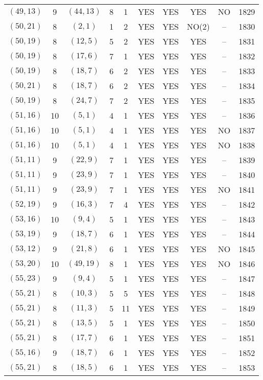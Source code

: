\begin{longtable}{|c|c|c|c|c|c|c|c|c|c|}
$(49, 13)$ & 9 & $(44, 13)$ & 8 & 1 & YES & YES & YES & NO & 1829\\
$(50, 21)$ & 8 & $(2, 1)$ & 1 & 2 & YES & YES & NO(2) & -- & 1830\\
$(50, 19)$ & 8 & $(12, 5)$ & 5 & 2 & YES & YES & YES & -- & 1831\\
$(50, 19)$ & 8 & $(17, 6)$ & 7 & 1 & YES & YES & YES & -- & 1832\\
$(50, 19)$ & 8 & $(18, 7)$ & 6 & 2 & YES & YES & YES & -- & 1833\\
$(50, 21)$ & 8 & $(18, 7)$ & 6 & 2 & YES & YES & YES & -- & 1834\\
$(50, 19)$ & 8 & $(24, 7)$ & 7 & 2 & YES & YES & YES & -- & 1835\\
$(51, 16)$ & 10 & $(5, 1)$ & 4 & 1 & YES & YES & YES & -- & 1836\\
$(51, 16)$ & 10 & $(5, 1)$ & 4 & 1 & YES & YES & YES & NO & 1837\\
$(51, 16)$ & 10 & $(5, 1)$ & 4 & 1 & YES & YES & YES & NO & 1838\\
$(51, 11)$ & 9 & $(22, 9)$ & 7 & 1 & YES & YES & YES & -- & 1839\\
$(51, 11)$ & 9 & $(23, 9)$ & 7 & 1 & YES & YES & YES & -- & 1840\\
$(51, 11)$ & 9 & $(23, 9)$ & 7 & 1 & YES & YES & YES & NO & 1841\\
$(52, 19)$ & 9 & $(16, 3)$ & 7 & 4 & YES & YES & YES & -- & 1842\\
$(53, 16)$ & 10 & $(9, 4)$ & 5 & 1 & YES & YES & YES & -- & 1843\\
$(53, 19)$ & 9 & $(18, 7)$ & 6 & 1 & YES & YES & YES & -- & 1844\\
$(53, 12)$ & 9 & $(21, 8)$ & 6 & 1 & YES & YES & YES & NO & 1845\\
$(53, 20)$ & 10 & $(49, 19)$ & 8 & 1 & YES & YES & YES & NO & 1846\\
$(55, 23)$ & 9 & $(9, 4)$ & 5 & 1 & YES & YES & YES & -- & 1847\\
$(55, 21)$ & 8 & $(10, 3)$ & 5 & 5 & YES & YES & YES & -- & 1848\\
$(55, 21)$ & 8 & $(11, 3)$ & 5 & 11 & YES & YES & YES & -- & 1849\\
$(55, 21)$ & 8 & $(13, 5)$ & 5 & 1 & YES & YES & YES & -- & 1850\\
$(55, 21)$ & 8 & $(17, 7)$ & 6 & 1 & YES & YES & YES & -- & 1851\\
$(55, 16)$ & 9 & $(18, 7)$ & 6 & 1 & YES & YES & YES & -- & 1852\\
$(55, 21)$ & 8 & $(18, 5)$ & 6 & 1 & YES & YES & YES & -- & 1853\\

\end{longtable}
